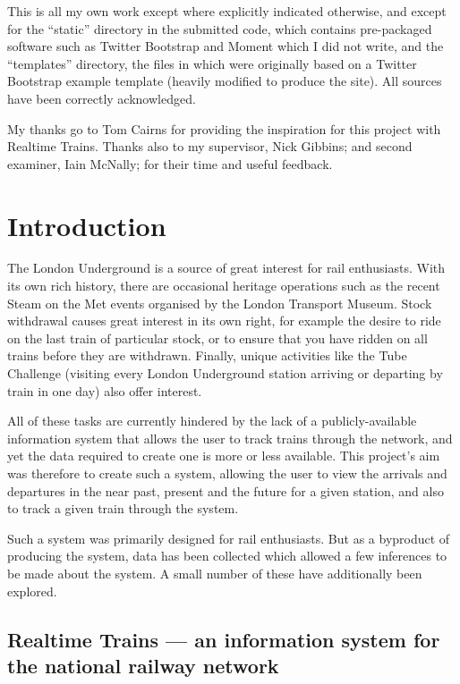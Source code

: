 \documentclass[a4paper,12pt]{report}
\begin{document}
This is all my own work except where explicitly indicated otherwise, and except
for the ``static'' directory in the submitted code, which contains pre-packaged
software such as Twitter Bootstrap and Moment which I did not write, and the
``templates'' directory, the files in which were originally based on a Twitter
Bootstrap example template (heavily modified to produce the site). All sources
have been correctly acknowledged. 

My thanks go to Tom Cairns for providing the inspiration for this project with
Realtime Trains. Thanks also to my supervisor, Nick Gibbins; and second
examiner, Iain McNally; for their time and useful feedback.

\pagebreak

\chapter{Introduction}

The London Underground is a source of great interest for rail enthusiasts. With
its own rich history, there are occasional heritage operations such as the
recent Steam on the Met events organised by the London Transport Museum. Stock
withdrawal causes great interest in its own right, for example the desire to
ride on the last train of particular stock, or to ensure that you have ridden
on all trains before they are withdrawn. Finally, unique activities like the
Tube Challenge (visiting every London Underground station arriving or departing
by train in one day) also offer interest.

All of these tasks are currently hindered by the lack of a publicly-available
information system that allows the user to track trains through the network,
and yet the data required to create one is more or less available. This
project's aim was therefore to create such a system, allowing the user to view
the arrivals and departures in the near past, present and the future for a
given station, and also to track a given train through the system.

Such a system was primarily designed for rail enthusiasts. But as a byproduct
of producing the system, data has been collected which allowed a few inferences
to be made about the system. A small number of these have additionally been
explored.

\section{Realtime Trains --- an information system for the national railway
network}
\end{document}

